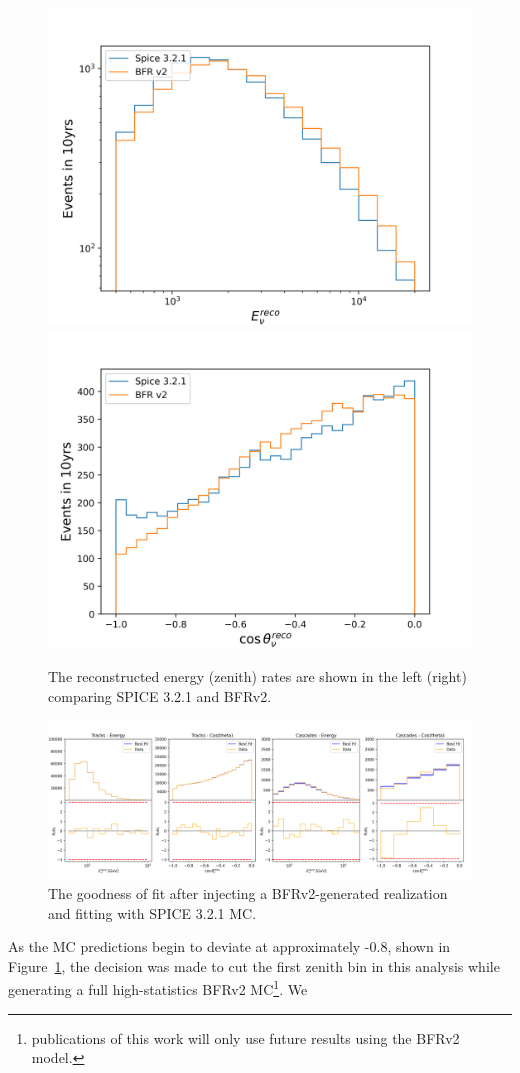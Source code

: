\documentclass[main.tex]{subfiles}
\begin{document}
\begin{figure}
    \centering
    \includegraphics[width=0.45\linewidth]{figures/ice_investigate/reco_energy_distrib_lognorm.png}%
    \includegraphics[width=0.45\linewidth]{figures/ice_investigate/true_zenith_distrib.png}
    \caption{The reconstructed energy (zenith) rates are shown in the left (right) comparing SPICE 3.2.1 and BFRv2.}\label{fig:bfr_spice_wow}
\end{figure}

\begin{figure}
    \centering
    \includegraphics[width=0.8\linewidth]{figures/ice_investigate/goodness_joint_injectbfr_fitspice_Realization_daemon_bfr_Asimov_sterile_0.png}
    \caption{The goodness of fit after injecting a BFRv2-generated realization and fitting with SPICE 3.2.1 MC.}\label{fig:icetest_gof}
\end{figure}

As the MC predictions begin to deviate at approximately -0.8, shown in Figure~\ref{fig:bfr_spice_wow}, the decision was made to cut the first zenith bin in this analysis while generating a full high-statistics BFRv2 MC\footnote{publications of this work will only use future results using the BFRv2 model.}. We 
\end{document}
